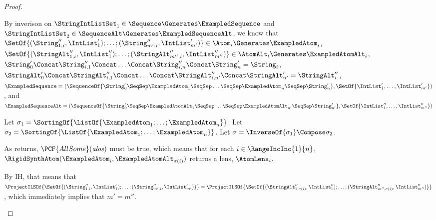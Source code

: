 \documentclass[sigplan,acmsmall]{acmart}
\begin{document}
\begin{proof}
\begin{case}[sequence]
    By inverison on 
    $\StringIntListSet_1 \in \Sequence \Generates \ExampledSequence$ and
    $\StringIntListSet_2 \in \SequenceAlt \Generates \ExampledSequenceAlt$,
    we know that\\
    $\SetOf{(\String_{1,i}'',\IntList_1');\ldots;(\String_{m',i}'',\IntList_{m'}')}
    \in \Atom_i \Generates \ExampledAtom_i$,\\
    $\SetOf{(\StringAlt_{1,i}'',\IntList_1'');\ldots;(\StringAlt_{m'',i}'',\IntList_{m''}'')}
    \in \AtomAlt_i \Generates \ExampledAtomAlt_i$,\\
    $\String_0'\Concat\String_{i,1}''\Concat\ldots\Concat\String_{i,n}''\Concat\String_n' = \String_i$,\\
    $\StringAlt_0'\Concat\StringAlt_{i,1}''\Concat\ldots\Concat\StringAlt_{i,n'}''\Concat\StringAlt_{n'}' = \StringAlt_i''$,\\
    $\ExampledSequence =
    (\SequenceOf{\String_0' \SeqSep \ExampledAtom_1 \SeqSep \ldots \SeqSep
      \ExampledAtom_n \SeqSep \String_n'},\SetOf{\IntList_1',\ldots,\IntList_{m'}'})$, and\\
    $\ExampledSequenceAlt =
    (\SequenceOf{\String_0' \SeqSep \ExampledAtomAlt_{1} \SeqSep \ldots \SeqSep
      \ExampledAtomAlt_{n'} \SeqSep \String_{n'}'},\SetOf{\IntList_1'',\ldots,\IntList_{m''}''})$

    Let $\sigma_1 =
    \SortingOf{\ListOf{\ExampledAtom_1;\ldots;\ExampledAtom_n}}$.
    Let $\sigma_2 =
    \SortingOf{\ListOf{\ExampledAtom_1;\ldots;\ExampledAtom_n}}$.
    Let $\sigma = \InverseOf{\sigma_1} \Compose \sigma_2$.

    As \RigidSynthSequence{} returns, $\PCF{AllSome}(\mathit{alos})$ must be true, which
    means that for each $i\in\RangeIncInc{1}{n}$,
    $\RigidSynthAtom(\ExampledAtom_i,\ExampledAtomAlt_{\sigma(i)})$ returns a
    lens, $\AtomLens_i$.
    
    By IH, that means that\\
    $\ProjectILSOf{\SetOf{(\String_{1,i}'',\IntList_1');\ldots;(\String_{m',i}'',\IntList_{m'}')}}\\
    =
    \ProjectILSOf{\SetOf{(\StringAlt_{1,\sigma(i)}'',\IntList_1'');\ldots;(\StringAlt_{m'',\sigma(i)}'',\IntList_{m''}'')}}$,
    which immediately implies that $m' = m''$.
    

\end{case}
\end{proof}
\end{document}
